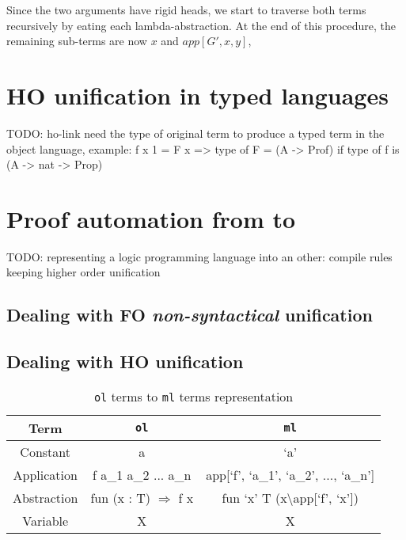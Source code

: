 \documentclass[acmengage]{acmart}
\def\elpi{\proglang{elpi}}
\def\coq{\proglang{coq}}
\newcommand*{\acronym}[1]{\texttt{#1}\xspace}
\def\ol{\acronym{ol}} %
\def\ml{\acronym{ml}} %
\begin{document}
Since the two arguments have rigid heads, we start to traverse both terms
recursively by eating each lambda-abstraction. At the end of this procedure, the
remaining sub-terms are  now $x$ and $app[G', x, y]$, 

\section{HO unification in typed languages}

TODO: ho-link need the type of original term to produce a typed term in the
object language, example: f x 1 = F x => type of F = (A -> Prof) if type of f is 
(A -> nat -> Prop)

\section{Proof automation from \coq to \elpi}

TODO: representing a logic programming language into an other: compile rules
keeping higher order unification

\subsection{Dealing with FO \textit{non-syntactical} unification}

\subsection{Dealing with HO unification}


\appendix

\begin{table}
  \centering
  \begin{tabular}{c||c|c}
  Term        & \ol                    & \ml                                   \\
  \hline\hline
  Constant    & a                             & `a'                                     \\
  Application & f a\_1 a\_2 ... a\_n          & app{[}`f', `a\_1', `a\_2', ..., `a\_n'{]}     \\
  Abstraction & fun (x : T) $\Rightarrow$ f x & fun `x' T (x\textbackslash app{[}`f', `x'{]}) \\
  Variable    & X                             & X                                             \\
  \end{tabular}
  \caption{\ol terms to \ml terms representation}
  \label{table:coq2elpi}
\end{table}
\end{document}
